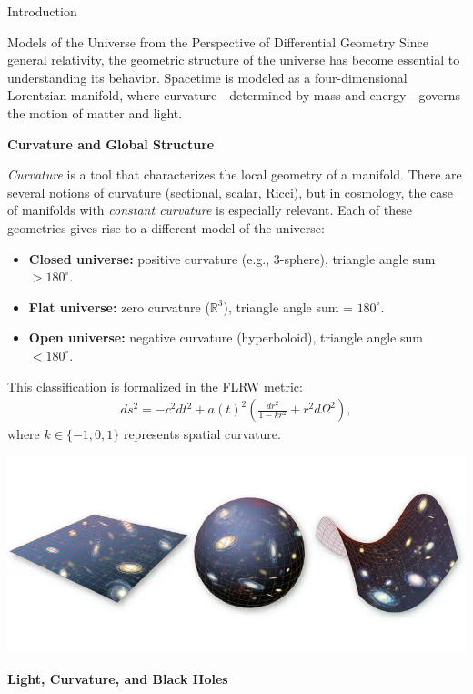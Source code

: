 \documentclass[final]{beamer}
\newlength{\colwidth}
\begin{document}
\begin{frame}[t]
\begin{columns}[t]
\begin{column}{\colwidth}
\begin{block}{Introduction}
  \end{block}

  \begin{alertblock}{Models of the Universe from the Perspective of Differential Geometry}
    Since general relativity, the geometric structure of the universe has become essential to understanding its behavior. Spacetime is modeled as a four-dimensional Lorentzian manifold, where curvature—determined by mass and energy—governs the motion of matter and light.

    \textbf{\large Curvature and Global Structure}

      \textit{Curvature} is a tool that characterizes the local geometry of a manifold. There are several notions of curvature (sectional, scalar, Ricci), but in cosmology, the case of manifolds with \textit{constant curvature} is especially relevant. Each of these geometries gives rise to a different model of the universe: 
        \begin{itemize}
          \item \textbf{Closed universe:} positive curvature (e.g., 3-sphere), triangle angle sum $> 180^\circ$.
          \item \textbf{Flat universe:} zero curvature ($\mathbb{R}^3$), triangle angle sum = $180^\circ$.
          \item \textbf{Open universe:} negative curvature (hyperboloid), triangle angle sum $< 180^\circ$.
        \end{itemize}
        This classification is formalized in the FLRW metric:
        \begin{align*}
        ds^2 = -c^2 dt^2 + a(t)^2 \left( \frac{dr^2}{1 - kr^2} + r^2 d\Omega^2 \right),
        \end{align*}
        where $k \in \{-1, 0, 1\}$ represents spatial curvature.
        \begin{center}
          \includegraphics[scale=0.8]{curvaturuniverso.jpg}
        \end{center}        
        \textbf{\large Light, Curvature, and Black Holes}


\end{alertblock}
\end{column}
\end{columns}
\end{frame}
\end{document}
